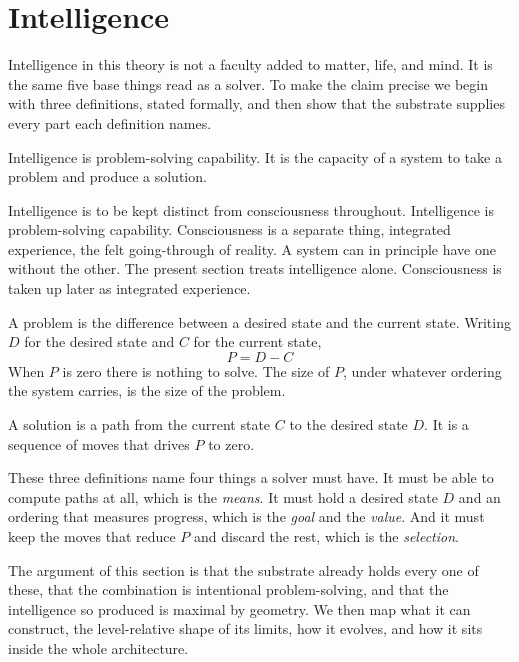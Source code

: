 \section{Intelligence}

Intelligence in this theory is not a faculty added to matter, life, and mind. It is the same five base things read as a solver. To make the claim precise we begin with three definitions, stated formally, and then show that the substrate supplies every part each definition names.

\begin{definition}[Intelligence]
Intelligence is problem-solving capability. It is the capacity of a system to take a problem and produce a solution.
\end{definition}

Intelligence is to be kept distinct from consciousness throughout. Intelligence is problem-solving capability. Consciousness is a separate thing, integrated experience, the felt going-through of reality. A system can in principle have one without the other. The present section treats intelligence alone. Consciousness is taken up later as integrated experience.

\begin{definition}[Problem]
A problem is the difference between a desired state and the current state. Writing $D$ for the desired state and $C$ for the current state,
\begin{equation}
P = D - C
\end{equation}
When $P$ is zero there is nothing to solve. The size of $P$, under whatever ordering the system carries, is the size of the problem.
\end{definition}

\begin{definition}[Solution]
A solution is a path from the current state $C$ to the desired state $D$. It is a sequence of moves that drives $P$ to zero.
\end{definition}

These three definitions name four things a solver must have. It must be able to compute paths at all, which is the \emph{means}. It must hold a desired state $D$ and an ordering that measures progress, which is the \emph{goal} and the \emph{value}. And it must keep the moves that reduce $P$ and discard the rest, which is the \emph{selection}.

The argument of this section is that the substrate already holds every one of these, that the combination is intentional problem-solving, and that the intelligence so produced is maximal by geometry. We then map what it can construct, the level-relative shape of its limits, how it evolves, and how it sits inside the whole architecture.

